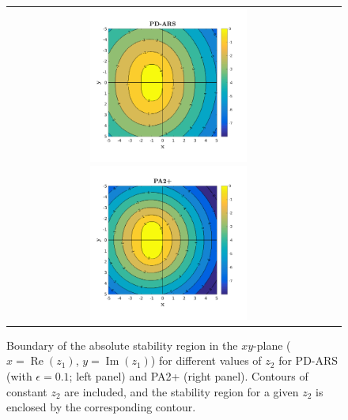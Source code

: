 \begin{figure}[h]
  \centering
  \begin{tabular}{cc}
    \includegraphics[width=0.5\textwidth]{figures/AbsoluteStabilityPARSD}
    \includegraphics[width=0.5\textwidth]{figures/AbsoluteStabilityPA2+}
  \end{tabular}
   \caption{Boundary of the absolute stability region in the $xy$-plane ($x=\operatorname{Re}(z_{1})$, $y=\operatorname{Im}(z_{1})$) for different values of $z_2$ for PD-ARS (with $\epsilon = 0.1$; left panel) and PA2+ (right panel).  Contours of constant $z_{2}$ are included, and the stability region for a given $z_{2}$ is enclosed by the corresponding contour.}
  \label{fig:AbsoluteStability}
\end{figure}